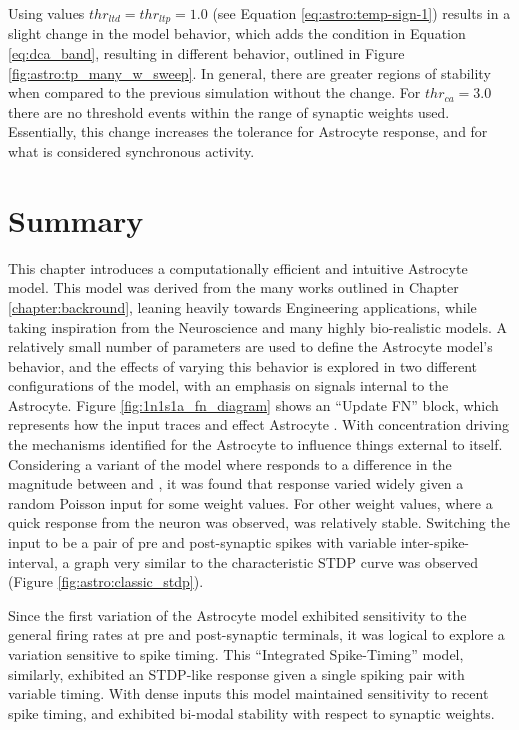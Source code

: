 Using values $thr_{ltd}=thr_{ltp}=1.0$ (see Equation \ref{eq:astro:temp-sign-1})
results in a slight change in the model behavior, which adds the condition in
Equation \ref{eq:dca_band}, resulting in different behavior, outlined in Figure
\ref{fig:astro:tp_many_w_sweep}. In general, there are greater regions of
stability when compared to the previous simulation without the
change. For $thr_{ca}=3.0$ there are no threshold events within the range of
synaptic weights used. Essentially, this change increases the tolerance for
Astrocyte response, and for what is considered synchronous activity.


\section{Summary}
This chapter introduces a computationally efficient and intuitive Astrocyte
model. This model was derived from the many works outlined in Chapter
\ref{chapter:backround}, leaning heavily towards Engineering applications,
while taking inspiration from the Neuroscience and many highly bio-realistic
models. A relatively small number of parameters are used to define the
Astrocyte model's behavior, and the effects of varying this behavior is
explored in two different configurations of the model, with an emphasis on
signals internal to the Astrocyte. Figure \ref{fig:1n1s1a_fn_diagram} shows
an ``Update FN'' block, which represents how the input traces \ipt and \kp
effect Astrocyte \ca. With \ca concentration driving the mechanisms
identified for the Astrocyte to influence things external to
itself. Considering a variant of the model where \ca responds to a
difference in the magnitude between \ipt and \kp, it was found that \ca
response varied widely given a random Poisson input for some weight values.
For other weight values, where a quick response from the neuron was
observed, \ca was relatively stable. Switching the input to be a pair
of pre and post-synaptic spikes with variable inter-spike-interval, a graph
very similar to the characteristic STDP curve was observed (Figure
\ref{fig:astro:classic_stdp}).

Since the first variation of the Astrocyte model exhibited sensitivity to
the general firing rates at pre and post-synaptic terminals, it was logical
to explore a variation sensitive to spike timing. This ``Integrated Spike-Timing''
model, similarly, exhibited an STDP-like \ca response given a single spiking
pair with variable timing. With dense inputs this model maintained sensitivity
to recent spike timing, and exhibited bi-modal stability with respect to
synaptic weights.
